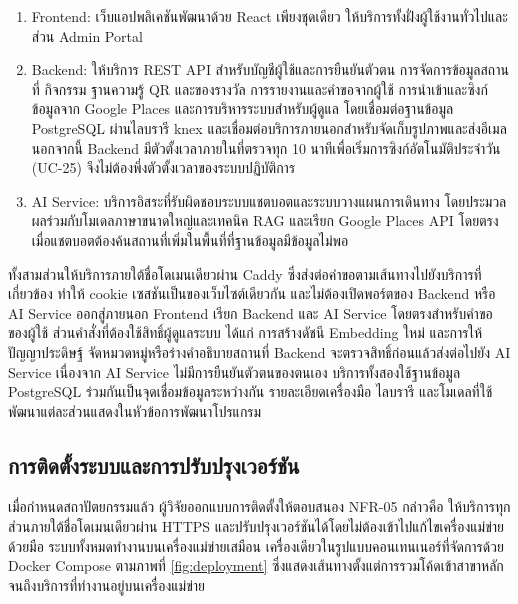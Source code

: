 \begin{enumerate}
\item Frontend: เว็บแอปพลิเคชันพัฒนาด้วย React เพียงชุดเดียว ให้บริการทั้งฝั่งผู้ใช้งานทั่วไปและส่วน Admin Portal
\item Backend: ให้บริการ REST API สำหรับบัญชีผู้ใช้และการยืนยันตัวตน การจัดการข้อมูลสถานที่ กิจกรรม ฐานความรู้ QR และของรางวัล การรายงานและคำขอจากผู้ใช้ การนำเข้าและซิงก์ข้อมูลจาก Google Places และการบริหารระบบสำหรับผู้ดูแล โดยเชื่อมต่อฐานข้อมูล PostgreSQL ผ่านไลบรารี knex และเชื่อมต่อบริการภายนอกสำหรับจัดเก็บรูปภาพและส่งอีเมล นอกจากนี้ Backend มีตัวตั้งเวลาภายในที่ตรวจทุก 10 นาทีเพื่อเริ่มการซิงก์อัตโนมัติประจำวัน (UC-25) จึงไม่ต้องพึ่งตัวตั้งเวลาของระบบปฏิบัติการ
\item AI Service: บริการอิสระที่รับผิดชอบระบบแชตบอตและระบบวางแผนการเดินทาง โดยประมวลผลร่วมกับโมเดลภาษาขนาดใหญ่และเทคนิค RAG และเรียก Google Places API โดยตรงเมื่อแชตบอตต้องค้นสถานที่เพิ่มในพื้นที่ที่ฐานข้อมูลมีข้อมูลไม่พอ
\end{enumerate}

ทั้งสามส่วนให้บริการภายใต้ชื่อโดเมนเดียวผ่าน Caddy ซึ่งส่งต่อคำขอตามเส้นทางไปยังบริการที่เกี่ยวข้อง ทำให้ cookie เซสชันเป็นของเว็บไซต์เดียวกัน และไม่ต้องเปิดพอร์ตของ Backend หรือ AI Service ออกสู่ภายนอก Frontend เรียก Backend และ AI Service โดยตรงสำหรับคำขอของผู้ใช้ ส่วนคำสั่งที่ต้องใช้สิทธิ์ผู้ดูแลระบบ ได้แก่ การสร้างดัชนี Embedding ใหม่ และการให้ปัญญาประดิษฐ์ จัดหมวดหมู่หรือร่างคำอธิบายสถานที่ Backend จะตรวจสิทธิ์ก่อนแล้วส่งต่อไปยัง AI Service เนื่องจาก AI Service ไม่มีการยืนยันตัวตนของตนเอง บริการทั้งสองใช้ฐานข้อมูล PostgreSQL ร่วมกันเป็นจุดเชื่อมข้อมูลระหว่างกัน รายละเอียดเครื่องมือ ไลบรารี และโมเดลที่ใช้พัฒนาแต่ละส่วนแสดงในหัวข้อการพัฒนาโปรแกรม

\subsection{การติดตั้งระบบและการปรับปรุงเวอร์ชัน}

เมื่อกำหนดสถาปัตยกรรมแล้ว ผู้วิจัยออกแบบการติดตั้งให้ตอบสนอง NFR-05 กล่าวคือ ให้บริการทุกส่วนภายใต้ชื่อโดเมนเดียวผ่าน HTTPS และปรับปรุงเวอร์ชันได้โดยไม่ต้องเข้าไปแก้ไขเครื่องแม่ข่ายด้วยมือ ระบบทั้งหมดทำงานบนเครื่องแม่ข่ายเสมือน เครื่องเดียวในรูปแบบคอนเทนเนอร์ที่จัดการด้วย Docker Compose ตามภาพที่ \ref{fig:deployment} ซึ่งแสดงเส้นทางตั้งแต่การรวมโค้ดเข้าสาขาหลักจนถึงบริการที่ทำงานอยู่บนเครื่องแม่ข่าย

